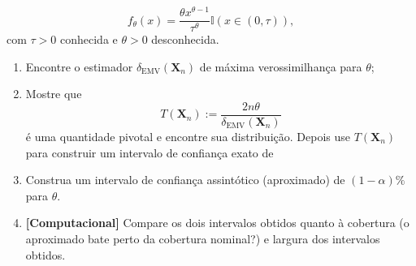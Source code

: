 \documentclass[a4paper,10pt, notitlepage]{report}
\newcommand{\bX}{\boldsymbol{X}} %
\begin{document}
\begin{enumerate}
\begin{equation*}
     f_\theta(x) = \frac{\theta x^{\theta-1}}{\tau^\theta}\mathbb{I}(x \in (0, \tau)),
 \end{equation*}
 com $\tau >0$ conhecida e $\theta > 0$ desconhecida.
 \begin{enumerate}
     \item Encontre o estimador $\delta_{\text{EMV}}(\bX_n)$ de máxima verossimilhança para $\theta$;
     \item Mostre que 
     \begin{equation*}
         T(\bX_n) := \frac{2n\theta}{\delta_{\text{EMV}}(\bX_n)}
     \end{equation*}
     é uma quantidade pivotal e encontre sua distribuição.
     Depois use $ T(\bX_n)$ para construir um intervalo de confiança exato de 
     \item Construa um intervalo de confiança assintótico (aproximado) de $(1-\alpha)\%$ para $\theta$.
     \item \textbf{[Computacional]} Compare os dois intervalos obtidos quanto à cobertura (o aproximado bate perto da cobertura nominal?) e largura dos intervalos obtidos.
 \end{enumerate}
\end{enumerate}
% 
% 
\end{document}
